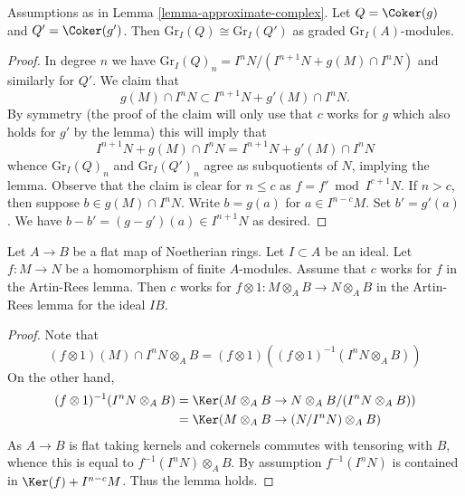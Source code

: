 \begin{lemma}
\label{lemma-approximate-complex-graded}
Assumptions as in Lemma \ref{lemma-approximate-complex}.
Let $Q = \Coker(g)$ and $Q' = \Coker(g')$. Then
$\text{Gr}_I(Q) \cong \text{Gr}_I(Q')$
as graded $\text{Gr}_I(A)$-modules.
\end{lemma}

\begin{proof}
In degree $n$ we have
$\text{Gr}_I(Q)_n = I^nN/(I^{n + 1}N + g(M) \cap I^nN)$
and similarly for $Q'$. We claim that
$$
g(M) \cap I^nN \subset I^{n + 1}N + g'(M) \cap I^nN.
$$
By symmetry (the proof of the claim will only use that $c$ works
for $g$ which also holds for $g'$ by the lemma) this will imply that
$$
I^{n + 1}N + g(M) \cap I^nN = I^{n + 1}N + g'(M) \cap I^nN
$$
whence $\text{Gr}_I(Q)_n$ and $\text{Gr}_I(Q')_n$ agree as subquotients
of $N$, implying the lemma. Observe that the claim is clear for
$n \leq c$ as $f = f' \bmod I^{c + 1}N$. If $n > c$, then suppose
$b \in g(M) \cap I^nN$. Write $b = g(a)$ for $a \in I^{n - c}M$.
Set $b' = g'(a)$. We have $b - b' = (g - g')(a) \in I^{n + 1}N$
as desired.
\end{proof}

\begin{lemma}
\label{lemma-works-flat-extension}
Let $A \to B$ be a flat map of Noetherian rings. Let $I \subset A$ be
an ideal. Let $f : M \to N$ be a homomorphism of finite $A$-modules.
Assume that $c$ works for $f$ in the Artin-Rees lemma. Then $c$ works for
$f \otimes 1 : M \otimes_A B \to N \otimes_A B$ in the Artin-Rees lemma
for the ideal $IB$.
\end{lemma}

\begin{proof}
Note that
$$
(f \otimes 1)(M) \cap I^n N \otimes_A B
= (f \otimes 1)\left((f \otimes 1)^{-1}(I^n N \otimes_A B)\right)
$$
On the other hand,
\begin{align*}
(f \otimes 1)^{-1}(I^n N \otimes_A B) &
= \Ker(M \otimes_A B \to N \otimes_A B/(I^n N \otimes_A B)) \\
& =
\Ker(M \otimes_A B \to (N/I^nN) \otimes_A B)
\end{align*}
As $A \to B$ is flat taking kernels and cokernels commutes with
tensoring with $B$, whence this is equal to
$f^{-1}(I^nN) \otimes_A B$. By assumption $f^{-1}(I^nN)$ is contained in
$\Ker(f) + I^{n - c}M$. Thus the lemma holds.
\end{proof}








